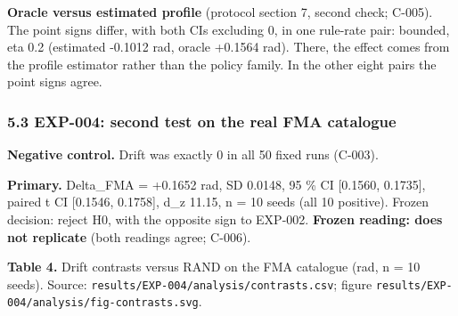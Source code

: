 \documentclass[
]{article}
\begin{document}
\textbf{Oracle versus estimated profile} (protocol section 7, second
check; C-005). The point signs differ, with both CIs excluding 0, in one
rule-rate pair: bounded, eta 0.2 (estimated -0.1012 rad, oracle +0.1564
rad). There, the effect comes from the profile estimator rather than the
policy family. In the other eight pairs the point signs agree.

\subsubsection{5.3 EXP-004: second test on the real FMA
catalogue}\label{exp-004-second-test-on-the-real-fma-catalogue}

\textbf{Negative control.} Drift was exactly 0 in all 50 fixed runs
(C-003).

\textbf{Primary.} Delta\_FMA = +0.1652 rad, SD 0.0148, 95 \% CI
{[}0.1560, 0.1735{]}, paired t CI {[}0.1546, 0.1758{]}, d\_z 11.15, n =
10 seeds (all 10 positive). Frozen decision: reject H0, with the
opposite sign to EXP-002. \textbf{Frozen reading: does not replicate}
(both readings agree; C-006).

\textbf{Table 4.} Drift contrasts versus RAND on the FMA catalogue (rad,
n = 10 seeds). Source: \texttt{results/EXP-004/analysis/contrasts.csv};
figure \texttt{results/EXP-004/analysis/fig-contrasts.svg}.
\end{document}
